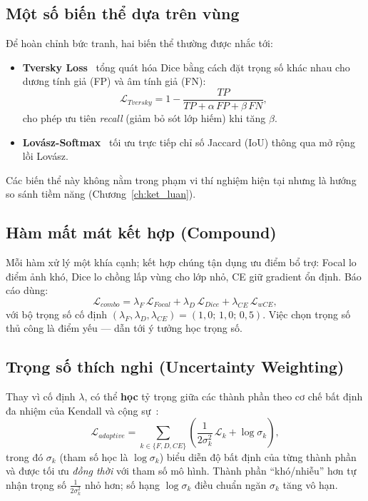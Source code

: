 \subsection{Một số biến thể dựa trên vùng}
Để hoàn chỉnh bức tranh, hai biến thể thường được nhắc tới:
\begin{itemize}[leftmargin=1.4cm]
  \item \textbf{Tversky Loss}~\cite{salehi2017tversky} tổng quát hóa Dice bằng cách
  đặt trọng số khác nhau cho dương tính giả (FP) và âm tính giả (FN):
  \begin{equation}
  \mathcal{L}_{Tversky} = 1 - \frac{TP}{TP + \alpha\,FP + \beta\,FN},
  \end{equation}
  cho phép ưu tiên \emph{recall} (giảm bỏ sót lớp hiếm) khi tăng $\beta$.
  \item \textbf{Lovász-Softmax}~\cite{berman2018lovasz} tối ưu trực tiếp chỉ số Jaccard
  (IoU) thông qua mở rộng lồi Lovász.
\end{itemize}
Các biến thể này không nằm trong phạm vi thí nghiệm hiện tại nhưng là hướng so sánh
tiềm năng (Chương~\ref{ch:ket_luan}).

\subsection{Hàm mất mát kết hợp (Compound)}
Mỗi hàm xử lý một khía cạnh; kết hợp chúng tận dụng ưu điểm bổ trợ: Focal lo điểm ảnh
khó, Dice lo chồng lấp vùng cho lớp nhỏ, CE giữ gradient ổn định. Báo cáo dùng:
\begin{equation}
\mathcal{L}_{combo} = \lambda_F\,\mathcal{L}_{Focal} + \lambda_D\,\mathcal{L}_{Dice}
+ \lambda_{CE}\,\mathcal{L}_{wCE},
\label{eq:combo}
\end{equation}
với bộ trọng số cố định $(\lambda_F,\lambda_D,\lambda_{CE}) = (1{,}0;\,1{,}0;\,0{,}5)$.
Việc chọn trọng số thủ công là điểm yếu --- dẫn tới ý tưởng học trọng số.

\subsection{Trọng số thích nghi (Uncertainty Weighting)}
\label{sec:adaptive}
Thay vì cố định $\lambda$, có thể \textbf{học} tỷ trọng giữa các thành phần theo cơ chế
bất định đa nhiệm của Kendall và cộng sự~\cite{kendall2018uncertainty}:
\begin{equation}
\mathcal{L}_{adaptive} = \sum_{k\in\{F,D,CE\}}
\left( \frac{1}{2\sigma_k^{2}}\,\mathcal{L}_k + \log\sigma_k \right),
\label{eq:adaptive}
\end{equation}
trong đó $\sigma_k$ (tham số học là $\log\sigma_k$) biểu diễn độ bất định của từng
thành phần và được tối ưu \emph{đồng thời} với tham số mô hình. Thành phần ``khó/nhiễu''
hơn tự nhận trọng số $\tfrac{1}{2\sigma_k^2}$ nhỏ hơn; số hạng $\log\sigma_k$ điều chuẩn
ngăn $\sigma_k$ tăng vô hạn.

